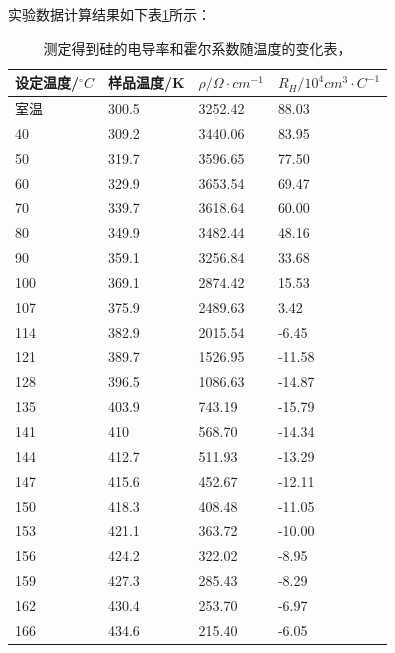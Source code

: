 \documentclass[aps,pre,12pt,preprint,onecolumn,showpacs,showkeys,UTF8]{revtex4-1}
\begin{document}
实验数据计算结果如下表\ref{t:1}所示：
\begin{center}
	\begin{table}[ht]
		\caption{测定得到硅的电导率和霍尔系数随温度的变化表，}
		\label{t:1}
		\begin{tabular}{m{3cm}<{\centering}m{3cm}<{\centering}m{3cm}<{\centering}m{3cm}<{\centering}}
			\hline
			\hline
			设定温度/$^{\circ}C$	&	样品温度/K	&	$\rho/\Omega\cdot cm^{-1}$	&	$R_H/10^4cm^3\cdot C^{-1}$	\\
\hline
室温	&	300.5	&	3252.42	&	88.03	\\
40	&	309.2	&	3440.06	&	83.95	\\
50	&	319.7	&	3596.65	&	77.50	\\
60	&	329.9	&	3653.54	&	69.47	\\
70	&	339.7	&	3618.64	&	60.00	\\
80	&	349.9	&	3482.44	&	48.16	\\
90	&	359.1	&	3256.84	&	33.68	\\
100	&	369.1	&	2874.42	&	15.53	\\
107	&	375.9	&	2489.63	&	3.42	\\
114	&	382.9	&	2015.54	&	-6.45	\\
121	&	389.7	&	1526.95	&	-11.58	\\
128	&	396.5	&	1086.63	&	-14.87	\\
135	&	403.9	&	743.19	&	-15.79	\\
141	&	410	&	568.70	&	-14.34	\\
144	&	412.7	&	511.93	&	-13.29	\\
147	&	415.6	&	452.67	&	-12.11	\\
150	&	418.3	&	408.48	&	-11.05	\\
153	&	421.1	&	363.72	&	-10.00	\\
156	&	424.2	&	322.02	&	-8.95	\\
159	&	427.3	&	285.43	&	-8.29	\\
162	&	430.4	&	253.70	&	-6.97	\\
166	&	434.6	&	215.40	&	-6.05	\\
\hline
\hline
		\end{tabular}
	\end{table}
\end{center}
\end{document}
